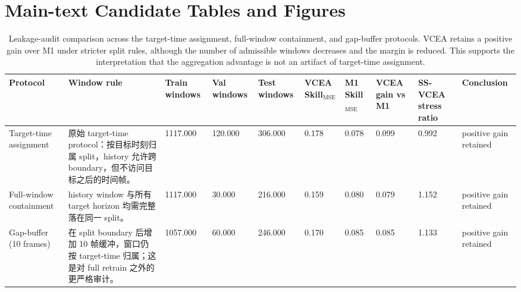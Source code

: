 














\section*{Main-text Candidate Tables and Figures}



\begin{table}[t]
\centering
\scriptsize
\begin{tabular}{llllllllll}
\toprule
Protocol & Window rule & Train windows & Val windows & Test windows & VCEA Skill$_{\mathrm{MSE}}$ & M1 Skill$_{\mathrm{MSE}}$ & VCEA gain vs M1 & SS-VCEA stress ratio & Conclusion \\
\midrule
Target-time assignment & 原始 target-time protocol：按目标时刻归属 split，history 允许跨 boundary，但不访问目标之后的时间帧。 & 1117.000 & 120.000 & 306.000 & 0.178 & 0.078 & 0.099 & 0.992 & positive gain retained \\
Full-window containment & history window 与所有 target horizon 均需完整落在同一 split。 & 1117.000 & 30.000 & 216.000 & 0.159 & 0.080 & 0.079 & 1.152 & positive gain retained \\
Gap-buffer (10 frames) & 在 split boundary 后增加 10 帧缓冲，窗口仍按 target-time 归属；这是对 full retrain 之外的更严格审计。 & 1057.000 & 60.000 & 246.000 & 0.170 & 0.085 & 0.085 & 1.133 & positive gain retained \\
\bottomrule
\end{tabular}
\caption{Leakage-audit comparison across the target-time assignment, full-window containment, and gap-buffer protocols. VCEA retains a positive gain over M1 under stricter split rules, although the number of admissible windows decreases and the margin is reduced. This supports the interpretation that the aggregation advantage is not an artifact of target-time assignment.}
\label{tab:e1_leakage_audit}
\end{table}

